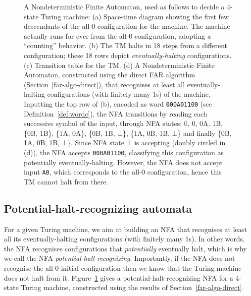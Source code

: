 \begin{figure}
  \caption{\small A Nondeterministic Finite Automaton, used as follows to decide a 4-state Turing machine\protect\footnotemark:
    (a) Space-time diagram showing the first few descendants of the all-0 configuration for the machine. The machine actually runs for ever from the all-0 configuration, adopting a ``counting'' behavior.
    (b) The TM halts in 18 steps from a different configuration; these 18 rows depict \emph{eventually-halting} configurations.
    (c) Transition table for the TM.
    (d) A Nondeterministic Finite Automaton, constructed using the direct FAR algorithm (Section~\ref{far-algo-direct}), that recognises at least all eventually-halting configurations (with finitely many 1s) of the machine. Inputting the top row of (b), encoded as word \texttt{000A01100} (see Definition~\ref{def:wordc}), the NFA transitions by reading each successive symbol of the input, through NFA states: 0, 0, 0A, 1B, \{0B, 1B\}, \{1A, 0A\}, \{0B, 1B, $\bot$\}, \{1A, 0B, 1B, $\bot$\} and finally \{0B, 1A, 0B, 1B, $\bot$\}. Since NFA state $\bot$ is accepting (doubly circled in (d)), the NFA accepts \texttt{000A01100}, classifying this configuration as potentially eventually-halting. However, the NFA does not accept input \texttt{A0}, which corresponds to the all-0 configuration, hence this TM cannot halt from there.}



  \label{fig:finite-automata-reduction}
\end{figure}


\subsection{Potential-halt-recognizing automata}
\newcommand{\M}{\mathcal{M}}
\newcommand{\T}{^T}
\newcommand{\row}{\text{row}}
\label{far-defs-recognizer}
For a given Turing machine, we aim at building an NFA that recognises at least all its eventually-halting configurations (with finitely many 1s). In other words, the NFA recognises configurations that \textit{potentially} eventually halt, which is why we call the NFA \textit{potential-halt-recognizing}. Importantly, if the NFA does not recognise the all-0 initial configuration then we know that the Turing machine does not halt from it. Figure~\ref{fig:finite-automata-reduction} gives a potential-halt-recognizing NFA for a 4-state Turing machine, constructed using the results of Section~\ref{far-algo-direct}.


